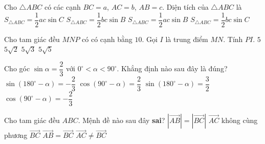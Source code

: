 \begin{ex}%
	Cho $\triangle ABC$ có các cạnh $BC=a$, $AC=b$, $AB=c$. Diện tích của $\triangle ABC$ là
	\choice
	{$S_{\triangle ABC}=\dfrac{1}{2}ac\sin C$}
	{$S_{\triangle ABC}=\dfrac{1}{2}bc\sin B$}
	{\True $S_{\triangle ABC}=\dfrac{1}{2}ac\sin B$}
	{$S_{\triangle ABC}=\dfrac{1}{2}bc\sin C$}
\end{ex}

\begin{ex}%
	Cho tam giác đều $ MNP $ có có cạnh bằng $10$. Gọi $I$ là trung điểm $MN$. Tính $PI$.
	\choice
	{$ 5 $}
	{$ 5\sqrt{2}$}
	{\True $ 5\sqrt{3} $}
	{$  5\sqrt{5}$}

\end{ex}

\begin{ex}%
	Cho góc $\sin\alpha=\dfrac{2}{3}$ với $0^\circ <\alpha <90^\circ$. Khẳng định nào sau đây là đúng?
	\choice
	{$\sin\left(180^\circ -\alpha\right) = -\dfrac{2}{3}$}
	{\True $\cos\left(90^\circ -\alpha\right)=\dfrac{2}{3}$}
	{$\sin\left(180^\circ -\alpha\right) = \dfrac{3}{2}$}
	{$\cos\left(90^\circ -\alpha\right)=-\dfrac{2}{3}$}
\end{ex}

\begin{ex}%
	Cho tam giác đều $ABC$. Mệnh đề nào sau đây \textbf{sai}?
	\choice
	{$\left|\overrightarrow{AB}\right|=\left|\overrightarrow{BC}\right|$}
	{$\overrightarrow{AC}$ không cùng phương $\overrightarrow{BC}$}
	{\True $\overrightarrow{AB}=\overrightarrow{BC}$}
	{$\overrightarrow{AC}\neq \overrightarrow{BC}$}
\end{ex}

